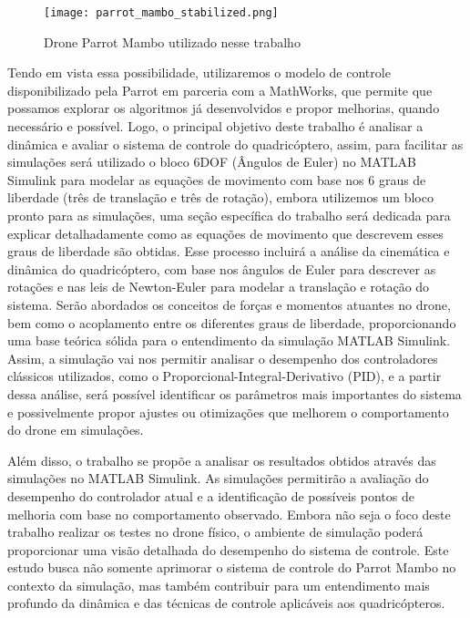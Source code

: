 \begin{figure}[H]
	\centering
	\texttt{[image: parrot\_mambo\_stabilized.png]}
	\caption{Drone Parrot Mambo utilizado nesse trabalho}
	\centering
	\label{drone-parrot}
\end{figure}


Tendo em vista essa possibilidade, utilizaremos o modelo de controle disponibilizado pela Parrot em parceria com a MathWorks, que permite que possamos explorar os algoritmos já desenvolvidos e propor melhorias, quando necessário e possível. Logo, o principal objetivo deste trabalho é analisar a dinâmica e avaliar o sistema de controle do quadricóptero, assim, para facilitar as simulações será utilizado o bloco 6DOF (Ângulos de Euler) no MATLAB Simulink para modelar as equações de movimento com base nos 6 graus de liberdade (três de translação e três de rotação), embora utilizemos um bloco pronto para as simulações, uma seção específica do trabalho será dedicada para explicar detalhadamente como as equações de movimento que descrevem esses graus de liberdade são obtidas. Esse processo incluirá a análise da cinemática e dinâmica do quadricóptero, com base nos ângulos de Euler para descrever as rotações e nas leis de Newton-Euler para modelar a translação e rotação do sistema. Serão abordados os conceitos de forças e momentos atuantes no drone, bem como o acoplamento entre os diferentes graus de liberdade, proporcionando uma base teórica sólida para o entendimento da simulação MATLAB Simulink. Assim, a simulação vai nos permitir analisar o desempenho dos controladores clássicos utilizados, como o Proporcional-Integral-Derivativo (PID), e a partir dessa análise, será possível identificar os parâmetros mais importantes do sistema e possivelmente propor ajustes ou otimizações que melhorem o comportamento do drone em simulações.

Além disso, o trabalho se propõe a analisar os resultados obtidos através das simulações no MATLAB Simulink. As simulações permitirão a avaliação do desempenho do controlador atual e a identificação de possíveis pontos de melhoria com base no comportamento observado. Embora não seja o foco deste trabalho realizar os testes no drone físico, o ambiente de simulação poderá proporcionar uma visão detalhada do desempenho do sistema de controle. Este estudo busca não somente aprimorar o sistema de controle do Parrot Mambo no contexto da simulação, mas também contribuir para um entendimento mais profundo da dinâmica e das técnicas de controle aplicáveis aos quadricópteros.







\printindex
